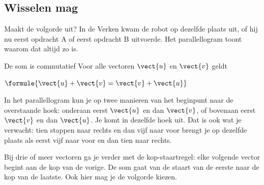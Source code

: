 \subsection{Wisselen mag}

Maakt de volgorde uit? In de Verken kwam de robot op dezelfde plaats uit, of hij nu eerst opdracht A of eerst opdracht B uitvoerde. Het parallellogram toont waarom dat altijd zo is.

\begin{theorie}
\begin{minipage}[t]{.64\linewidth}
\vspace{0pt}
\begin{stelling}{De som is commutatief}
Voor alle vectoren $\vect{u}$ en $\vect{v}$ geldt

\vspace{1mm}
\qquad $\formule{\vect{u} + \vect{v} = \vect{v} + \vect{u}}$
\end{stelling}
\end{minipage}\hfill
\begin{minipage}[t]{.32\linewidth}
\vspace{1mm}
\centering
{}
\end{minipage}
\end{theorie}

In het parallellogram kun je op twee manieren van het beginpunt naar de overstaande hoek: onderaan eerst $\vect{u}$ en dan $\vect{v}$, of bovenaan eerst $\vect{v}$ en dan $\vect{u}$. Je komt in dezelfde hoek uit. Dat is ook wat je verwacht: tien stappen naar rechts en dan vijf naar voor brengt je op dezelfde plaats als eerst vijf naar voor en dan tien naar rechts.

Bij drie of meer vectoren ga je verder met de kop-staartregel: elke volgende vector begint aan de kop van de vorige. De som gaat van de staart van de eerste naar de kop van de laatste. Ook hier mag je de volgorde kiezen.

